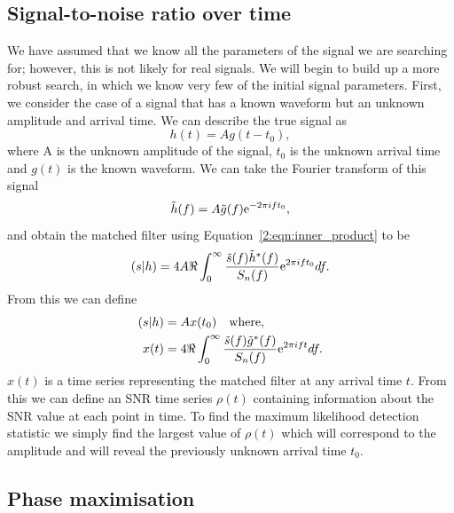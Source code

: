 \subsection{\label{2:sec:snr_timeseries}Signal-to-noise ratio over time}

We have assumed that we know all the parameters of the signal we are searching for; however, this is not likely for real \gwadj signals. We will begin to build up a more robust search, in which we know very few of the initial \gwadj signal parameters. First, we consider the case of a signal that has a known waveform but an unknown amplitude and arrival time. We can describe the true signal as
%
\begin{equation}
    h(t) = A g(t - t_{0}),
\end{equation}
%
where A is the unknown amplitude of the signal, $t_{0}$ is the unknown arrival time and $g(t)$ is the known waveform. We can take the Fourier transform of this signal
%
\begin{equation}
    \tilde{h}(f) = A \tilde{g}(f) {\rm e}^{-2\pi i f t_{0}},
\end{equation}
%
and obtain the matched filter using Equation~\ref{2:eqn:inner_product} to be
%
\begin{equation}
    (s|h) = 4 A \Re \int^{\infty}_{0} \frac{\tilde{s}(f) \tilde{h}^*(f)}{S_n(f)} {\rm e}^{2\pi i f t_{0}} df.
\end{equation}
%
From this we can define
%
\begin{align}
    (s|h) &= A x(t_{0}) \quad \text{where}, \\
    x(t) &= 4 \Re \int^{\infty}_{0} \frac{\tilde{s}(f) \tilde{g}^*(f)}{S_n(f)} {\rm e}^{2\pi i f t} df.
\end{align}
%
$x(t)$ is a time series representing the matched filter at any arrival time $t$. From this we can define an SNR time series $\rho(t)$ containing information about the SNR value at each point in time. To find the maximum likelihood detection statistic we simply find the largest value of $\rho(t)$ which will correspond to the amplitude and will reveal the previously unknown arrival time $t_{0}$.

\subsection{\label{2:sec:phase-maximisation}Phase maximisation}

